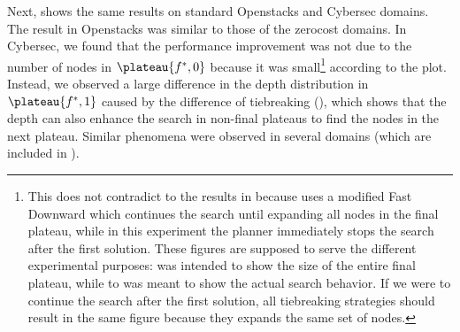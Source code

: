 Next,  shows the same results on standard
Openstacks and Cybersec domains.
The result in Openstacks was similar to those of the zerocost domains.
In Cybersec,
we found that the performance improvement was not due to the number of nodes in $\plateau{f^*,0}$ because it was small\footnote{This does not contradict to the results in  because  uses a modified Fast Downward which continues the search until expanding all nodes in the final plateau, while in this experiment the planner immediately stops the search after the first solution. These figures are supposed to serve the different experimental purposes:  was intended to show the size of the entire final plateau, while  to  was meant to show the actual search behavior. If we were to continue the search after the first solution, all tiebreaking strategies should result in the same figure because they expands the same set of nodes.} according to the plot.
Instead, we observed a large difference in the depth distribution in $\plateau{f^*,1}$ caused by the difference of tiebreaking (), which shows that the depth can also enhance the search in non-final plateaus to find the nodes in the next plateau.
Similar phenomena were observed in several domains (which are included in ).


